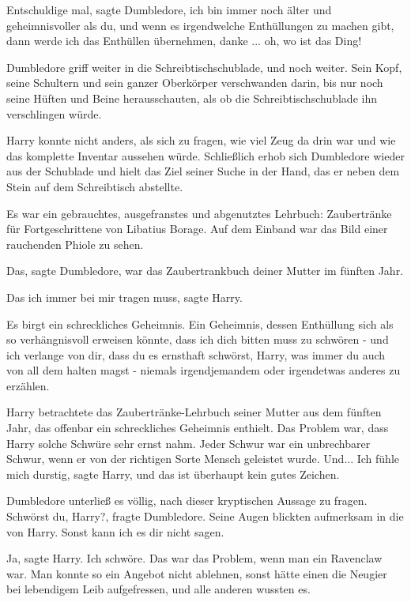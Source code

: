 \glqq Entschuldige mal\grqq{}, sagte Dumbledore, \glqq ich bin immer noch älter
und geheimnisvoller als du, und wenn es irgendwelche Enthüllungen zu machen
gibt, dann werde ich das Enthüllen übernehmen, danke ... oh, wo ist das
Ding!\grqq{}

Dumbledore griff weiter in die Schreibtischschublade, und noch weiter. Sein
Kopf, seine Schultern und sein ganzer Oberkörper verschwanden darin, bis nur
noch seine Hüften und Beine herausschauten, als ob die Schreibtischschublade ihn
verschlingen würde.

Harry konnte nicht anders, als sich zu fragen, wie viel Zeug da drin war und wie
das komplette Inventar aussehen würde. Schließlich erhob sich Dumbledore wieder
aus der Schublade und hielt das Ziel seiner Suche in der Hand, das er neben dem
Stein auf dem Schreibtisch abstellte.

Es war ein gebrauchtes, ausgefranstes und abgenutztes Lehrbuch: Zaubertränke für
Fortgeschrittene von Libatius Borage. Auf dem Einband war das Bild einer
rauchenden Phiole zu sehen.

\glqq Das\grqq{}, sagte Dumbledore, \glqq war das Zaubertrankbuch deiner Mutter
im fünften Jahr.\grqq{}

\glqq Das ich immer bei mir tragen muss\grqq{}, sagte Harry.

\glqq Es birgt ein schreckliches Geheimnis. Ein Geheimnis, dessen Enthüllung
sich als so verhängnisvoll erweisen könnte, dass ich dich bitten muss zu
schwören - und ich verlange von dir, dass du es ernsthaft schwörst, Harry, was
immer du auch von all dem halten magst - niemals irgendjemandem oder irgendetwas
anderes zu erzählen.\grqq{}

Harry betrachtete das Zaubertränke-Lehrbuch seiner Mutter aus dem fünften Jahr,
das offenbar ein schreckliches Geheimnis enthielt. Das Problem war, dass Harry
solche Schwüre sehr ernst nahm. Jeder Schwur war ein unbrechbarer Schwur, wenn
er von der richtigen Sorte Mensch geleistet wurde. Und... \glqq Ich fühle mich
durstig\grqq{}, sagte Harry, \glqq und das ist überhaupt kein gutes
Zeichen.\grqq{}

Dumbledore unterließ es völlig, nach dieser kryptischen Aussage zu fragen. \glqq
Schwörst du, Harry?\grqq{}, fragte Dumbledore. Seine Augen blickten aufmerksam
in die von Harry. \glqq Sonst kann ich es dir nicht sagen.\grqq{}

\glqq Ja\grqq{}, sagte Harry. \glqq Ich schwöre.\grqq{} Das war das Problem,
wenn man ein Ravenclaw war. Man konnte so ein Angebot nicht ablehnen, sonst
hätte einen die Neugier bei lebendigem Leib aufgefressen, und alle anderen
wussten es.

